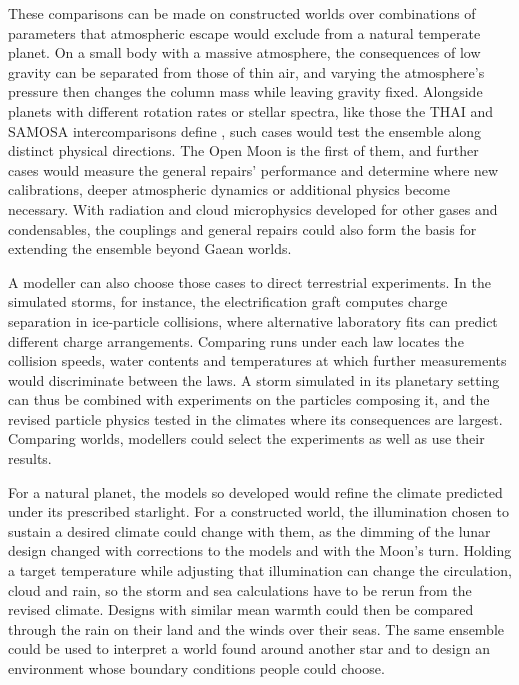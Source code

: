 These comparisons can be made on constructed worlds over combinations of parameters that atmospheric escape
would exclude from a natural temperate planet. On a small body with a massive atmosphere, the consequences of low gravity can be separated from those of thin air, and varying the atmosphere's pressure then changes the column mass while
leaving gravity fixed. Alongside planets with different rotation rates or stellar spectra, like those the
THAI and SAMOSA intercomparisons define \autocite{sergeev2022thai,haqqmisra2022samosa}, such cases would test the
ensemble along distinct physical directions. The Open Moon is the first of them,
and further cases would measure the general repairs' performance and determine where new calibrations,
deeper atmospheric dynamics or additional physics become necessary. With radiation and cloud microphysics
developed for other gases and condensables, the
couplings and general repairs could also form the basis for extending the ensemble beyond Gaean worlds.

A modeller can also choose those cases to direct terrestrial experiments. In the simulated storms, for
instance, the electrification graft computes charge separation in ice-particle collisions, where alternative
laboratory fits can predict different charge arrangements. Comparing runs under each law locates the
collision speeds, water contents and temperatures at which further measurements would discriminate between the
laws. A storm simulated in its planetary setting can thus be combined with experiments on the particles composing it,
and the revised particle physics tested in the climates where its consequences are largest. Comparing worlds, modellers could select the experiments as well as use their results.

For a natural planet, the models so developed would refine the climate predicted under its prescribed starlight. For a constructed world, the illumination chosen to sustain a desired climate could change with them, as the dimming of the lunar design changed with corrections to the models and with the Moon's turn. Holding a target
temperature while adjusting that illumination can change the circulation, cloud and rain, so the storm and sea calculations have to be rerun from the revised climate. Designs with similar mean warmth could
then be compared through the rain on their land and the winds over their seas.
The same ensemble could be used to interpret a world found around another star and to design an environment whose boundary conditions people could choose.

